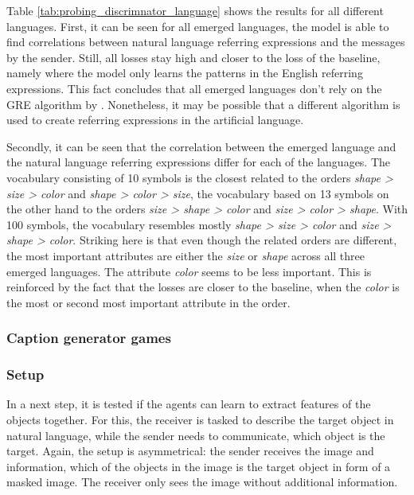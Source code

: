 Table \ref{tab:probing_discrimnator_language} shows the results for all different languages.
First, it can be seen for all emerged languages, the model is able to find correlations between natural language referring expressions and the messages by the sender.
Still, all losses stay high and closer to the loss of the baseline, namely where the model only learns the patterns in the English referring expressions.
This fact concludes that all emerged languages don't rely on the GRE algorithm by \cite{Dale1995}.
Nonetheless, it may be possible that a different algorithm is used to create referring expressions in the artificial language.

Secondly, it can be seen that the correlation between the emerged language and the natural language referring expressions differ for each of the languages.
The vocabulary consisting of 10 symbols is the closest related to the orders \emph{shape > size > color} and \emph{shape > color > size}, the vocabulary based on 13 symbols on the other hand to the orders \emph{size > shape > color} and \emph{size > color > shape}.
With 100 symbols, the vocabulary resembles mostly \emph{shape > size > color} and \emph{size > shape > color}.
Striking here is that even though the related orders are different, the most important attributes are either the \emph{size} or \emph{shape} across all three emerged languages.
The attribute \emph{color} seems to be less important.
This is reinforced by the fact that the losses are closer to the baseline, when the \emph{color} is the most or second most important attribute in the order.


\subsubsection{Caption generator games}
\subsubsection*{Setup}

In a next step, it is tested if the agents can learn to extract features of the objects together.
For this, the receiver is tasked to describe the target object in natural language, while the sender needs to communicate, which object is the target.
Again, the setup is asymmetrical: the sender receives the image and information, which of the objects in the image is the target object in form of a masked image.
The receiver only sees the image without additional information.

